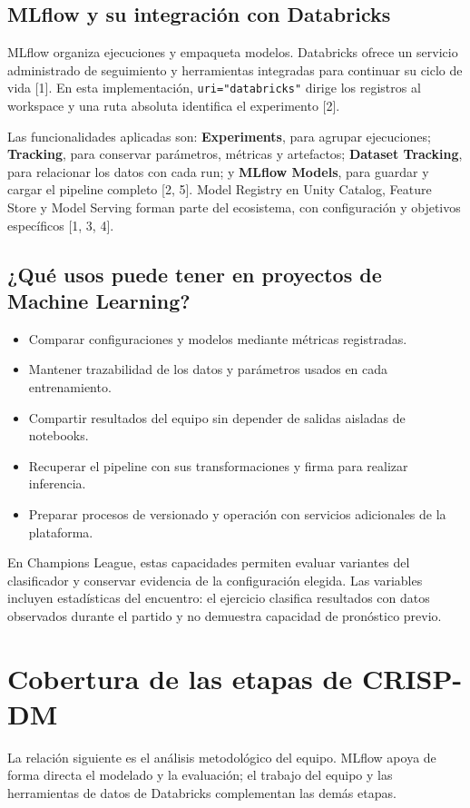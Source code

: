 \documentclass[12pt,a4paper]{article}
\begin{document}
\subsection{MLflow y su integración con Databricks}
MLflow organiza ejecuciones y empaqueta modelos. Databricks ofrece un servicio administrado de seguimiento y herramientas integradas para continuar su ciclo de vida [1]. En esta implementación, \texttt{uri="databricks"} dirige los registros al workspace y una ruta absoluta identifica el experimento [2].

Las funcionalidades aplicadas son: \textbf{Experiments}, para agrupar ejecuciones; \textbf{Tracking}, para conservar parámetros, métricas y artefactos; \textbf{Dataset Tracking}, para relacionar los datos con cada run; y \textbf{MLflow Models}, para guardar y cargar el pipeline completo [2, 5]. Model Registry en Unity Catalog, Feature Store y Model Serving forman parte del ecosistema, con configuración y objetivos específicos [1, 3, 4].

\subsection{¿Qué usos puede tener en proyectos de Machine Learning?}
\begin{itemize}
\item Comparar configuraciones y modelos mediante métricas registradas.
\item Mantener trazabilidad de los datos y parámetros usados en cada entrenamiento.
\item Compartir resultados del equipo sin depender de salidas aisladas de notebooks.
\item Recuperar el pipeline con sus transformaciones y firma para realizar inferencia.
\item Preparar procesos de versionado y operación con servicios adicionales de la plataforma.
\end{itemize}

En Champions League, estas capacidades permiten evaluar variantes del clasificador y conservar evidencia de la configuración elegida. Las variables incluyen estadísticas del encuentro: el ejercicio clasifica resultados con datos observados durante el partido y no demuestra capacidad de pronóstico previo.

\newpage
\section{Cobertura de las etapas de CRISP-DM}
La relación siguiente es el análisis metodológico del equipo. MLflow apoya de forma directa el modelado y la evaluación; el trabajo del equipo y las herramientas de datos de Databricks complementan las demás etapas.
\end{document}

